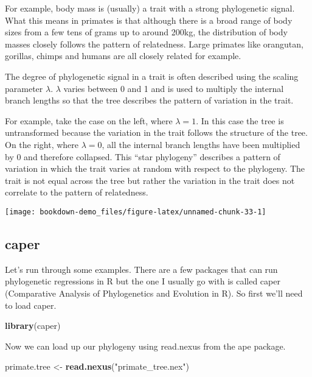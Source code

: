 \documentclass[]{book}
\newenvironment{Shaded}{\begin{snugshade}}{\end{snugshade}}
\newcommand{\KeywordTok}[1]{\textcolor[rgb]{0.13,0.29,0.53}{\textbf{#1}}}
\newcommand{\StringTok}[1]{\textcolor[rgb]{0.31,0.60,0.02}{#1}}
\newcommand{\NormalTok}[1]{#1}
\begin{document}
For example, body mass is (usually) a trait with a strong phylogenetic
signal. What this means in primates is that although there is a broad
range of body sizes from a few tens of grams up to around 200kg, the
distribution of body masses closely follows the pattern of relatedness.
Large primates like orangutan, gorillas, chimps and humans are all
closely related for example.

The degree of phylogenetic signal in a trait is often described using
the scaling parameter \(\lambda\). \(\lambda\) varies between 0 and 1
and is used to multiply the internal branch lengths so that the tree
describes the pattern of variation in the trait.

For example, take the case on the left, where \(\lambda = 1\). In this
case the tree is untransformed because the variation in the trait
follows the structure of the tree. On the right, where \(\lambda = 0\),
all the internal branch lengths have been multiplied by 0 and therefore
collapsed. This ``star phylogeny'' describes a pattern of variation in
which the trait varies at random with respect to the phylogeny. The
trait is not equal across the tree but rather the variation in the trait
does not correlate to the pattern of relatedness.

\begin{center}\texttt{[image: bookdown-demo\_files/figure-latex/unnamed-chunk-33-1]} \end{center}

\subsection{caper}\label{caper}

Let's run through some examples. There are a few packages that can run
phylogenetic regressions in R but the one I usually go with is called
caper (Comparative Analysis of Phylogenetics and Evolution in R). So
first we'll need to load caper.

\begin{Shaded}
\begin{Highlighting}[]
\KeywordTok{library}\NormalTok{(caper)}
\end{Highlighting}
\end{Shaded}

Now we can load up our phylogeny using read.nexus from the ape package.

\begin{Shaded}
\begin{Highlighting}[]
\NormalTok{primate.tree <-}\StringTok{ }\KeywordTok{read.nexus}\NormalTok{(}\StringTok{"primate_tree.nex"}\NormalTok{)}
\end{Highlighting}
\end{Shaded}
\end{document}
